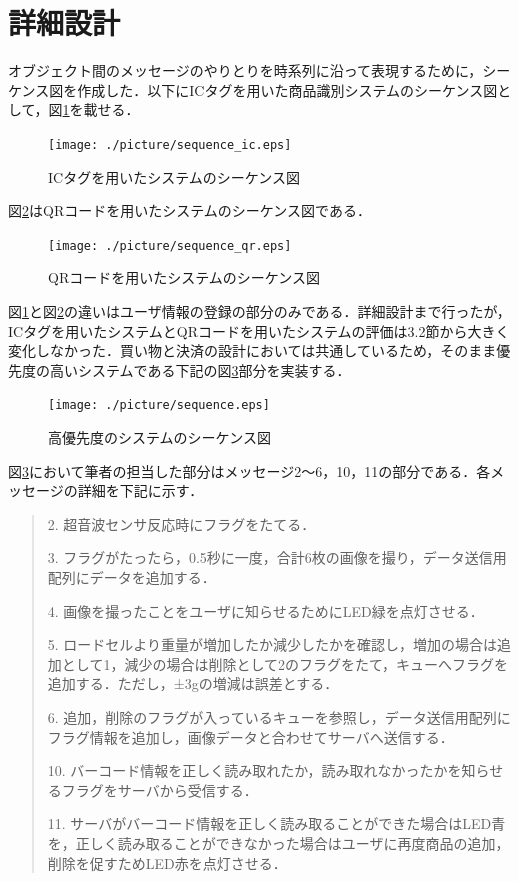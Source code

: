 

\section{詳細設計}

オブジェクト間のメッセージのやりとりを時系列に沿って表現するために，シーケンス図を作成した．以下にICタグを用いた商品識別システムのシーケンス図として，図\ref{sequence_ic}を載せる．

\begin{figure}[htbp]
\centering
\texttt{[image: ./picture/sequence\_ic.eps]}
\caption{ICタグを用いたシステムのシーケンス図}
\label{sequence_ic}
\end{figure}


図\ref{sequence_qr}はQRコードを用いたシステムのシーケンス図である．


\begin{figure}[htbp]
\centering
\texttt{[image: ./picture/sequence\_qr.eps]}
\caption{QRコードを用いたシステムのシーケンス図}
\label{sequence_qr}
\end{figure}


図\ref{sequence_ic}と図\ref{sequence_qr}の違いはユーザ情報の登録の部分のみである．詳細設計まで行ったが，ICタグを用いたシステムとQRコードを用いたシステムの評価は3.2節から大きく変化しなかった．買い物と決済の設計においては共通しているため，そのまま優先度の高いシステムである下記の図\ref{sequence}部分を実装する．



\begin{figure}[htbp]
\centering
\texttt{[image: ./picture/sequence.eps]}
\caption{高優先度のシステムのシーケンス図}
\label{sequence}
\end{figure}


図\ref{sequence}において筆者の担当した部分はメッセージ2～6，10，11の部分である．各メッセージの詳細を下記に示す．


\begin{quote}
2. 超音波センサ反応時にフラグをたてる．

3. フラグがたったら，0.5秒に一度，合計6枚の画像を撮り，データ送信用配列にデータを追加する．

4. 画像を撮ったことをユーザに知らせるためにLED緑を点灯させる．

5. ロードセルより重量が増加したか減少したかを確認し，増加の場合は追加として1，減少の場合は削除として2のフラグをたて，キューへフラグを追加する．ただし，±3gの増減は誤差とする．

6. 追加，削除のフラグが入っているキューを参照し，データ送信用配列にフラグ情報を追加し，画像データと合わせてサーバへ送信する．

10. バーコード情報を正しく読み取れたか，読み取れなかったかを知らせるフラグをサーバから受信する．

11. サーバがバーコード情報を正しく読み取ることができた場合はLED青を，正しく読み取ることができなかった場合はユーザに再度商品の追加，削除を促すためLED赤を点灯させる．
\end{quote}

